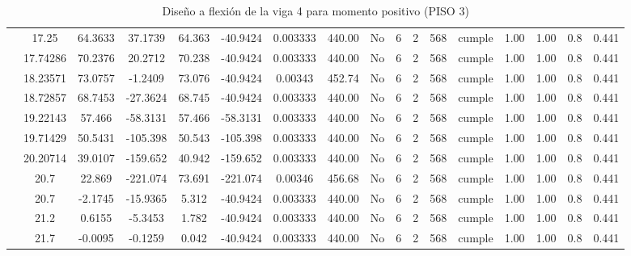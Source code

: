 \begin{table}[H]
{\begin{tabular}{|c|c|c|c|c|c|c|c|c|c|c|c|c|c|c|c|c|}
\cline{2-17}        & 17.25 & 64.3633 & 37.1739 & 64.363 & -40.9424 & 0.003333 & 440.00 & No  & 6   & 2   & 568 & \cellcolor[rgb]{ .776,  .937,  .808}cumple & 1.00 & 1.00 & 0.8 & 0.441 \bigstrut\\
\cline{2-17}        & 17.74286 & 70.2376 & 20.2712 & 70.238 & -40.9424 & 0.003333 & 440.00 & No  & 6   & 2   & 568 & \cellcolor[rgb]{ .776,  .937,  .808}cumple & 1.00 & 1.00 & 0.8 & 0.441 \bigstrut\\
\cline{2-17}        & 18.23571 & 73.0757 & -1.2409 & 73.076 & -40.9424 & 0.00343 & 452.74 & No  & 6   & 2   & 568 & \cellcolor[rgb]{ .776,  .937,  .808}cumple & 1.00 & 1.00 & 0.8 & 0.441 \bigstrut\\
\cline{2-17}        & 18.72857 & 68.7453 & -27.3624 & 68.745 & -40.9424 & 0.003333 & 440.00 & No  & 6   & 2   & 568 & \cellcolor[rgb]{ .776,  .937,  .808}cumple & 1.00 & 1.00 & 0.8 & 0.441 \bigstrut\\
\cline{2-17}        & 19.22143 & 57.466 & -58.3131 & 57.466 & -58.3131 & 0.003333 & 440.00 & No  & 6   & 2   & 568 & \cellcolor[rgb]{ .776,  .937,  .808}cumple & 1.00 & 1.00 & 0.8 & 0.441 \bigstrut\\
\cline{2-17}        & 19.71429 & 50.5431 & -105.398 & 50.543 & -105.398 & 0.003333 & 440.00 & No  & 6   & 2   & 568 & \cellcolor[rgb]{ .776,  .937,  .808}cumple & 1.00 & 1.00 & 0.8 & 0.441 \bigstrut\\
\cline{2-17}        & 20.20714 & 39.0107 & -159.652 & 40.942 & -159.652 & 0.003333 & 440.00 & No  & 6   & 2   & 568 & \cellcolor[rgb]{ .776,  .937,  .808}cumple & 1.00 & 1.00 & 0.8 & 0.441 \bigstrut\\
\cline{2-17}        & \cellcolor[rgb]{ .851,  .882,  .949}20.7 & 22.869 & -221.074 & 73.691 & -221.074 & 0.00346 & 456.68 & No  & 6   & 2   & 568 & \cellcolor[rgb]{ .776,  .937,  .808}cumple & 1.00 & 1.00 & 0.8 & 0.441 \bigstrut\\
\cline{2-17}        & \cellcolor[rgb]{ .851,  .882,  .949}20.7 & -2.1745 & -15.9365 & 5.312 & -40.9424 & 0.003333 & 440.00 & No  & 6   & 2   & 568 & \cellcolor[rgb]{ .776,  .937,  .808}cumple & 1.00 & 1.00 & 0.8 & 0.441 \bigstrut\\
\cline{2-17}        & 21.2 & 0.6155 & -5.3453 & 1.782 & -40.9424 & 0.003333 & 440.00 & No  & 6   & 2   & 568 & \cellcolor[rgb]{ .776,  .937,  .808}cumple & 1.00 & 1.00 & 0.8 & 0.441 \bigstrut\\
\cline{2-17}        & 21.7 & -0.0095 & -0.1259 & 0.042 & -40.9424 & 0.003333 & 440.00 & No  & 6   & 2   & 568 & \cellcolor[rgb]{ .776,  .937,  .808}cumple & 1.00 & 1.00 & 0.8 & 0.441 \bigstrut\\
    \hline
    \end{tabular}%
  

  }%
    \caption{Diseño a flexión de la viga 4 para momento positivo (PISO 3) }
  \label{tab:F VG4 P3 M+}%
\end{table}%
